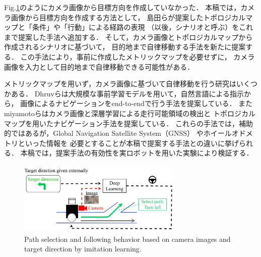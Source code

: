 \documentclass{sice-si}
\begin{document}
Fig.\ref{fig:camera_base}のようにカメラ画像から目標方向を作成していなかった．
本稿では，カメラ画像から目標方向を作成する方法として，
島田ら\cite{shimada2020}が提案したトポロジカルマップと「条件」や「行動」による経路の表現
（以後，シナリオと呼ぶ）をこれまで提案した手法へ追加する．
そして，カメラ画像とトポロジカルマップから作成されるシナリオに基づいて，
目的地まで自律移動する手法を新たに提案する．
この手法により，事前に作成したメトリックマップを必要せずに，
カメラ画像を入力として目的地まで自律移動できる可能性がある．
\par
メトリックマップを用いず，カメラ画像に基づいて自律移動を行う研究はいくつかある．
Dhruvら\cite{shah2022lmnav}は大規模な事前学習モデルを用いて，自然言語による指示から，
画像によるナビゲーションをend-to-endで行う手法を提案している．
またmiyamotoら\cite{seg_meizi}はカメラ画像と深層学習による走行可能領域の検出と
トポロジカルマップを用いたナビゲーション手法を提案している．
これらの手法では，補助的ではあるが，Global Navigation Satellite System（GNSS）
やホイールオドメトリといった情報を
必要とすることが本稿で提案する手法との違いに挙げられる．
本稿では，提案手法の有効性を実ロボットを用いた実験により検証する．
\begin{figure}[h]
    \centering
     \includegraphics[height=35mm,width=78mm]{./figs/learninggamma.png}
     \caption{Path selection and following behavior based on camera images and
     target direction by imitation learning.}\label{fig:camera_base}
\end{figure}
\end{document}
